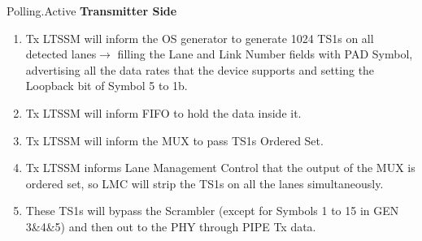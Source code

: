     Polling.Active
  \newline
  \textbf{Transmitter Side}
  \begin{enumerate}
    \item Tx LTSSM will inform the OS 
    generator to generate 1024 TS1s
     on all detected lanes$ \rightarrow$
      filling the Lane and Link Number
       fields with PAD Symbol, advertising
        all the data rates that the device
         supports and setting the Loopback bit of Symbol 5 to 1b.
    \item Tx LTSSM will inform FIFO to hold the data inside it.
    \item Tx LTSSM will inform the MUX to pass TS1s Ordered Set.
    \item Tx LTSSM informs Lane Management Control that the output of the MUX is ordered set, so LMC will strip the TS1s on all the lanes simultaneously.
    \item  These TS1s will bypass the Scrambler (except for Symbols 1 to 15 in GEN 3\&4\&5) and then out to the PHY through PIPE Tx data.

  \end{enumerate}
  


